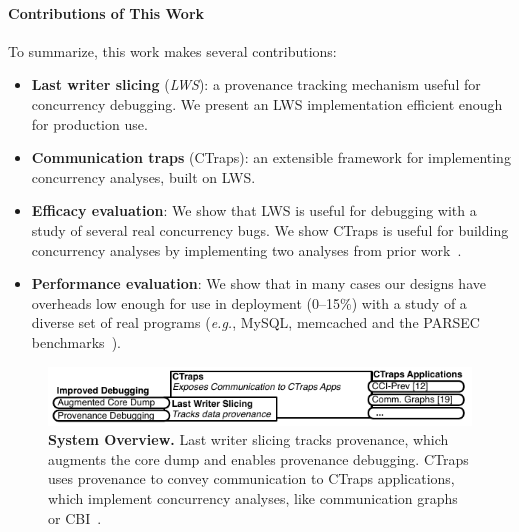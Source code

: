 \documentclass[pageno,nohyperref]{jpaper}
\newcommand{\ctraps}{CTraps\xspace}
\newcommand{\lws}{LWS\xspace}
\newcommand{\Caption}[1]{\begin{minipage}{.95\columnwidth} \caption{#1} \end{minipage} \vspace{-1.2ex}}
\begin{document}
\paragraph{Contributions of This Work}
To summarize, this work makes several contributions:
\begin{itemize}

\item{{\bf Last writer slicing} ({\em LWS}): a provenance tracking mechanism
useful for concurrency debugging.  We present an \lws implementation
efficient enough for production use.}

\item{{\bf Communication traps} (\ctraps): an extensible
framework for implementing concurrency analyses, built on \lws.  }

\item{{\bf Efficacy evaluation}: We show that \lws is useful for debugging with
a study of several real concurrency bugs.  We show \ctraps is useful for
building concurrency analyses by implementing two analyses from prior
work~\cite{cci,defuse,recon}. }

\item{{\bf Performance evaluation}: We show that in many cases our designs have
overheads low enough for use in deployment (0--15\%) with a study of a diverse
set of real programs ({\em e.g.}, MySQL, memcached and the PARSEC
benchmarks~\cite{parsec}).  }

\end{itemize}

\begin{figure}[h]
\centering
\includegraphics[width=\columnwidth]{figs/systemoverview.pdf}
\Caption{\label{fig:overview}{\bf System Overview.} Last writer slicing tracks provenance, which augments the core dump and enables provenance debugging.  CTraps uses provenance to convey communication to CTraps applications, which implement concurrency analyses, like communication graphs~\cite{recon} or CBI~\cite{cci}.}
\end{figure}
\end{document}
